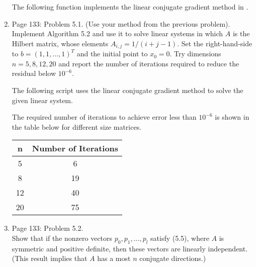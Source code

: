 \documentclass[11pt, oneside]{article}
\begin{document}
\begin{enumerate}
    The following function implements the linear conjugate gradient method in
    \PYTHON.
    

  \item %
    Page 133: Problem 5.1. (Use your method from the previous problem). \\
    Implement Algorithm 5.2 and use it to solve linear systems in which $A$
    is the Hilbert matrix, whose elements $A_{i, j} = 1/(i + j - 1)$.
    Set the right-hand-side to $b = (1, 1, \ldots, 1)^T$ and the initial point
    to $x_0 = 0$.
    Try dimensions $n = 5, 8, 12, 20$ and report the number of iterations
    required to reduce the residual below $10^{-6}$.

    The following script uses the linear conjugate gradient method to solve the
    given linear system.
    

    The required number of iterations to achieve error less than $10^{-6}$ is
    shown in the table below for different size matrices.
    \begin{center}
      \begin{tabular}{cc}
        \toprule
           n & Number of Iterations \\
        \midrule
           5 &  6 \\
           8 & 19 \\
          12 & 40 \\
          20 & 75 \\
        \bottomrule
      \end{tabular}
    \end{center}

  \item %
    Page 133: Problem 5.2. \\
    Show that if the nonzero vectors $p_0, p_1, \ldots, p_l$ satisfy (5.5),
    where $A$ is symmetric and positive definite, then these vectors are
    linearly independent.
    (This result implies that $A$ has a most $n$ conjugate directions.)


\end{enumerate}
\end{document}
